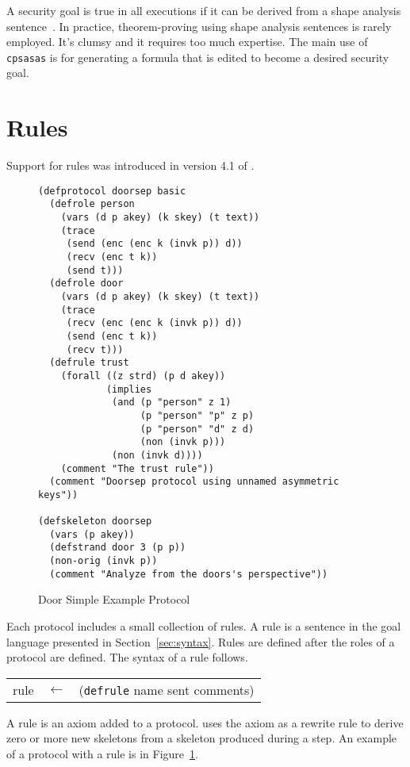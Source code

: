 \documentclass[12pt]{article}
\newcommand{\sym}[1]{\textup{\texttt{#1}}}
\begin{document}
A security goal is true in all executions if it can be derived from a
shape analysis sentence~\cite{Ramsdell12}.  In practice,
theorem-proving using shape analysis sentences is rarely employed.
It's clumsy and it requires too much expertise.  The main use of
\texttt{cpsasas} is for generating a formula that is edited to become
a desired security goal.

\section{Rules}\label{sec: rules}

Support for rules was introduced in version 4.1 of {\cpsa}.

\begin{figure}
\begin{verbatim}
(defprotocol doorsep basic
  (defrole person
    (vars (d p akey) (k skey) (t text))
    (trace
     (send (enc (enc k (invk p)) d))
     (recv (enc t k))
     (send t)))
  (defrole door
    (vars (d p akey) (k skey) (t text))
    (trace
     (recv (enc (enc k (invk p)) d))
     (send (enc t k))
     (recv t)))
  (defrule trust
    (forall ((z strd) (p d akey))
            (implies
             (and (p "person" z 1)
                  (p "person" "p" z p)
                  (p "person" "d" z d)
                  (non (invk p)))
             (non (invk d))))
    (comment "The trust rule"))
  (comment "Doorsep protocol using unnamed asymmetric keys"))

(defskeleton doorsep
  (vars (p akey))
  (defstrand door 3 (p p))
  (non-orig (invk p))
  (comment "Analyze from the doors's perspective"))
\end{verbatim}
\caption{Door Simple Example Protocol}\label{fig:doorsep}
\end{figure}

Each protocol includes a small collection of rules.  A rule is a
sentence in the goal language presented in Section~\ref{sec:syntax}.
Rules are defined after the roles of a protocol are defined.  The
syntax of a rule follows.

\begin{center}\scshape
  \begin{tabular}{rcl}
    rule&$\leftarrow$&(\sym{defrule} name sent comments)
  \end{tabular}
\end{center}

A rule is an axiom added to a protocol.  {\cpsa} uses the axiom as a
rewrite rule to derive zero or more new skeletons from a skeleton
produced during a step.  An example of a protocol with a rule is in
Figure~\ref{fig:doorsep}.
\end{document}
